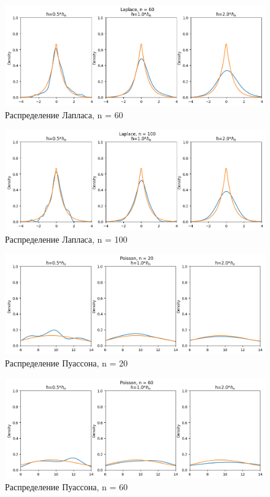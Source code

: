 \begin{figure}[H]
	\includegraphics[width=\textwidth]{tasks/4/res/32.png}
	\caption{Распределение Лапласа, n = 60} 
\end{figure}
	
\begin{figure}[H]
	\includegraphics[width=\textwidth]{tasks/4/res/33.png}
	\caption{Распределение Лапласа, n = 100} 
\end{figure}
	
\begin{figure}[H]
	\includegraphics[width=\textwidth]{tasks/4/res/41.png}
	\caption{Распределение Пуассона, n = 20} 
\end{figure}
	
\begin{figure}[H]
	\includegraphics[width=\textwidth]{tasks/4/res/42.png}
	\caption{Распределение Пуассона, n = 60} 
\end{figure}
	
